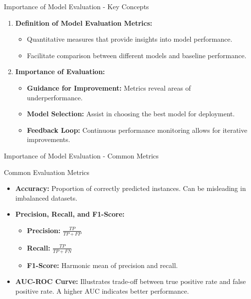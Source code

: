 \documentclass[aspectratio=169]{beamer}
\begin{document}
\begin{frame}[fragile]{Importance of Model Evaluation - Key Concepts}
    \begin{enumerate}
        \item \textbf{Definition of Model Evaluation Metrics:}
            \begin{itemize}
                \item Quantitative measures that provide insights into model performance.
                \item Facilitate comparison between different models and baseline performance.
            \end{itemize}
        
        \item \textbf{Importance of Evaluation:}
            \begin{itemize}
                \item \textbf{Guidance for Improvement:} Metrics reveal areas of underperformance.
                \item \textbf{Model Selection:} Assist in choosing the best model for deployment.
                \item \textbf{Feedback Loop:} Continuous performance monitoring allows for iterative improvements.
            \end{itemize}
    \end{enumerate}
\end{frame}

\begin{frame}[fragile]{Importance of Model Evaluation - Common Metrics}
    \begin{block}{Common Evaluation Metrics}
        \begin{itemize}
            \item \textbf{Accuracy:} Proportion of correctly predicted instances. Can be misleading in imbalanced datasets.
            \item \textbf{Precision, Recall, and F1-Score:}
                \begin{itemize}
                    \item \textbf{Precision:} $\frac{TP}{TP + FP}$
                    \item \textbf{Recall:} $\frac{TP}{TP + FN}$
                    \item \textbf{F1-Score:} Harmonic mean of precision and recall.
                \end{itemize}
            \item \textbf{AUC-ROC Curve:} Illustrates trade-off between true positive rate and false positive rate. A higher AUC indicates better performance.
        \end{itemize}
    \end{block}
\end{frame}
\end{document}
